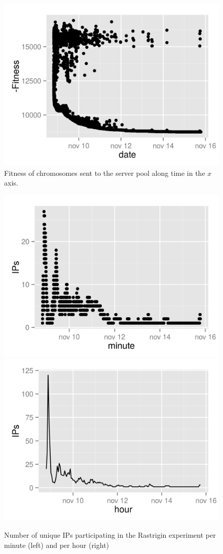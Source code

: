 \documentclass[journal,onecolumn]{IEEEtran}
\begin{document}
%
\begin{figure}[!htb]
\centering
\includegraphics{rastrigin-fitness.png}
\caption{Fitness of chromosomes sent to the server pool along time in
  the $x$ axis.} 
\label{fig:puts:rastrigin}
\end{figure}
%
\begin{figure}[!htb]
\centering
\includegraphics[width=0.49\linewidth]{rastrigin-IPs.png}
\includegraphics[width=0.49\linewidth]{rastrigin-ips-hour.png}
\caption{Number of unique IPs participating in the Rastrigin
  experiment per minute (left) and per hour (right)} 
\label{fig:ips:rastrigin}
\end{figure}
\end{document}
